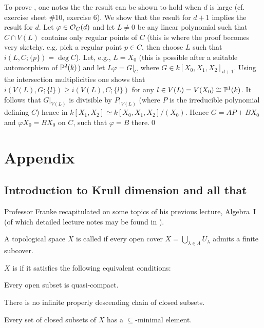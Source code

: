 \documentclass[a4paper,parskip=half,numbers=enddot, DIV=12]{scrreprt}
\begin{document}
To prove , one notes the the result can be shown to hold when $d$ is large (cf. exercise sheet \#10, exercise 6).
We show that the result for $d+1$ implies the result for $d$.
Let $\varphi\in \mathcal{O}_C(d)$
and let $L\neq 0$ be any linear polynomial such that $C\cap V(L)$ contains only regular points of $C$
(this is where the proof becomes very sketchy. e.g. pick a regular point $p\in C$,
then choose $L$ such that $i(L,C;\{p\})=\deg C$).
Let, e.g., $L=X_0$ (this is possible after a suitable automorphism of $\mathbb{P}^2(k)$) and let $L\varphi = G\vert_C$ where
$G\in k[X_0,X_1,X_2]_{d+1}$. Using the intersection multiplicities one shows that $i(V(L),G;\{l\})\geq i(V(L),C;\{l\})$ for any $l\in V(L) = V(X_0)\cong \mathbb{P}^1(k)$.
It follows that $G\vert_{V(L)}$ is divisible by $P\vert_{V(L)}$ (where $P$ is
the irreducible polynomial defining $C$) hence in $k[X_1,X_2] \simeq k[X_0,X_1,X_2]/(X_0)$. Hence
$G=AP+BX_0$ and $\varphi X_0=BX_0$ on $C$, such that $\varphi=B$ there.\qed





















\appendix
\chapter{Appendix}
\setcounter{thm}{0}
\renewcommand*{\thethm}{\Alph{thm}}
\section{Introduction to Krull dimension and all that}
Professor Franke recapitulated on some topics of his previous lecture, Algebra~I (of which detailed lecture notes may be found in \cite{alg1}).
\begin{defi}
	A topological space $X$ is called  if every open cover $X = \bigcup_{\lambda\in\Lambda} U_\lambda$ admits a finite subcover.
	
	$X$ is  if it satisfies the following equivalent conditions:
	\begin{alphanumerate}
		\item Every open subset is quasi-compact.
		\item There is no infinite properly descending chain of closed subsets.
		\item Every set of closed subsets of $X$ has a $\subseteq$-minimal element.
	\end{alphanumerate}
\end{defi}
\end{document}
